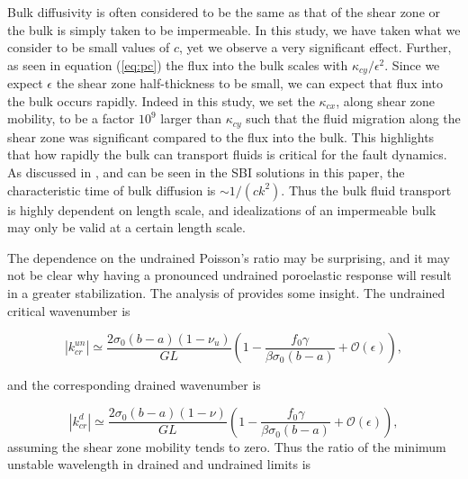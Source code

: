 \documentclass[draft]{agujournal2019}
\begin{document}
Bulk diffusivity is often considered to be the same as that of the shear zone or the bulk is simply taken to be impermeable. In this study, we have taken what we consider to be small values of $c$, yet we observe a very significant effect. Further, as seen in equation (\ref{eq:pc}) the flux into the bulk scales with $\kappa_{cy}/\epsilon^2$. Since we expect $\epsilon$ the shear zone half-thickness to be small, we can expect that flux into the bulk occurs rapidly. Indeed in this study, we set the $\kappa_{cx}$, along shear zone mobility, to be a factor $10^9$ larger than $\kappa_{cy}$ such that the fluid migration along the shear zone was significant compared to the flux into the bulk. This highlights that how rapidly the bulk can transport fluids is critical for the fault dynamics. As discussed in , and can be seen in the SBI solutions in this paper, the characteristic time of bulk diffusion is $\sim 1/(c k^2)$. Thus the bulk fluid transport is highly dependent on length scale, and idealizations of an impermeable bulk may only be valid at a certain length scale.

The dependence on the undrained Poisson's ratio may be surprising, and it may not be clear why having a pronounced undrained poroelastic response will result in a greater stabilization. The analysis of  provides some insight. The undrained critical wavenumber is 

\begin{equation}
|k_{cr}^{un}| \simeq \frac{2 \sigma_0(b-a)(1-\nu_u)}{GL} \left(1 - \frac{f_0 \gamma}{ \beta \sigma_0 (b-a) } + \mathcal{O}(\epsilon) \right) ,
\label{eq:kappa0un} 
\end{equation}

and the corresponding drained wavenumber is 

\begin{equation}
|k_{cr}^d| \simeq \frac{2 \sigma_0(b-a)(1-\nu)}{GL} \left(1 - \frac{f_0 \gamma}{ \beta \sigma_0 (b-a) } + \mathcal{O}(\epsilon) \right) ,
\label{eq:kappa0d} 
\end{equation}
assuming the shear zone mobility tends to zero. Thus the ratio of the minimum unstable wavelength in drained and undrained limits is
\end{document}
